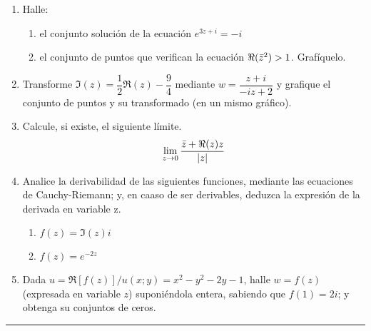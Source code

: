 \documentclass[9pt,a4paper]{extarticle}
\begin{document}
\begin{enumerate}
\item Halle:
\begin{enumerate}
    \item el conjunto solución de la ecuación $e^{3z+i} = -i$
    \item el conjunto de puntos que verifican la ecuación $\Re({\Bar{z}}^2) > 1$. Grafíquelo.
\end{enumerate}
\item Transforme $\Im(z)=\dfrac{1}{2}\Re(z)-\dfrac{9}{4}$ mediante $w=\dfrac{z+i}{-iz+2}$ y grafique el conjunto de puntos y su transformado (en un mismo gráfico).
\item Calcule, si existe, el siguiente límite. $$\lim_{z \to 0} \dfrac{\Bar{z}+\Re(z)z}{|z|}$$
\item Analice la derivabilidad de las siguientes funciones, mediante las ecuaciones de Cauchy-Riemann; y, en caaso de ser derivables, deduzca la expresión de la derivada en variable z.
\begin{enumerate}
    \item $f(z)=\Im(z)i$
    \item $f(z)=e^{-2z}$
\end{enumerate}

\item Dada $u=\Re[f(z)]/u(x;y)=x^2-y^2-2y-1$, halle $w=f(z)$ (expresada en variable $z$) suponiéndola entera, sabiendo que $f(1)=2i$; y obtenga su conjuntos de ceros.
\end{enumerate}
\hrule
\end{document}
